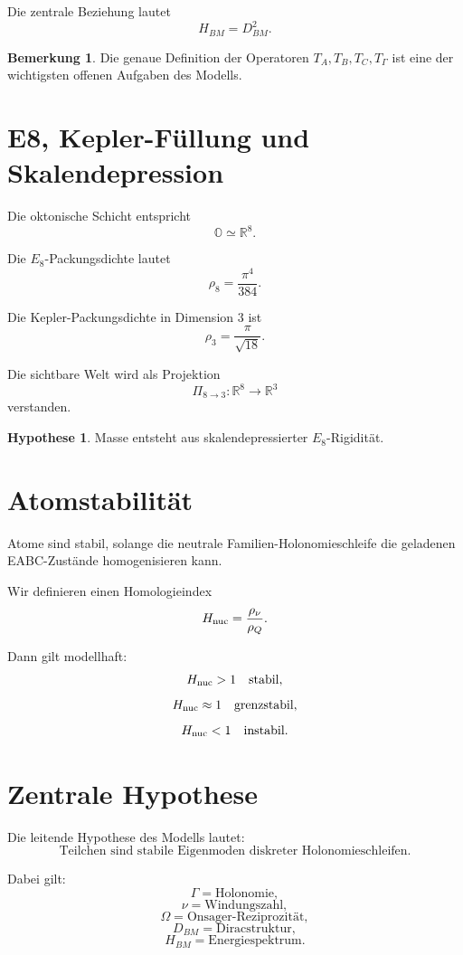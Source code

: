 \documentclass[11pt,a4paper]{article}
\theoremstyle{definition}
\newtheorem{hypothese}[satz]{Hypothese}
\newtheorem{bemerkung}[satz]{Bemerkung}
\begin{document}
	Die zentrale Beziehung lautet
	\[
	H_{BM}=D_{BM}^2.
	\]
	
	\begin{bemerkung}
		Die genaue Definition der Operatoren \(T_A,T_B,T_C,T_\Gamma\) ist eine der wichtigsten offenen Aufgaben des Modells.
	\end{bemerkung}
	
	\section{E8, Kepler-Füllung und Skalendepression}
	
	Die oktonische Schicht entspricht
	\[
	\mathbb O\simeq\mathbb R^8.
	\]
	
	Die \(E_8\)-Packungsdichte lautet
	\[
	\rho_8=\frac{\pi^4}{384}.
	\]
	
	Die Kepler-Packungsdichte in Dimension \(3\) ist
	\[
	\rho_3=\frac{\pi}{\sqrt{18}}.
	\]
	
	Die sichtbare Welt wird als Projektion
	\[
	\Pi_{8\to3}:\mathbb R^8\to\mathbb R^3
	\]
	verstanden.
	
	\begin{hypothese}
		Masse entsteht aus skalendepressierter \(E_8\)-Rigidität.
	\end{hypothese}
	
	\section{Atomstabilität}
	
	Atome sind stabil, solange die neutrale Familien-Holonomieschleife die geladenen EABC-Zustände homogenisieren kann.
	
	Wir definieren einen Homologieindex
	\[
	H_{\rm nuc}=\frac{\rho_\nu}{\rho_Q}.
	\]
	
	Dann gilt modellhaft:
	\[
	H_{\rm nuc}>1\quad\text{stabil},
	\]
	\[
	H_{\rm nuc}\approx1\quad\text{grenzstabil},
	\]
	\[
	H_{\rm nuc}<1\quad\text{instabil}.
	\]
	
	\section{Zentrale Hypothese}
	
	Die leitende Hypothese des Modells lautet:
	\[
	\boxed{
		\text{Teilchen sind stabile Eigenmoden diskreter Holonomieschleifen.}
	}
	\]
	
	Dabei gilt:
	\[
	\Gamma=\text{Holonomie},
	\]
	\[
	\nu=\text{Windungszahl},
	\]
	\[
	\Omega=\text{Onsager-Reziprozität},
	\]
	\[
	D_{BM}=\text{Diracstruktur},
	\]
	\[
	H_{BM}=\text{Energiespektrum}.
	\]
	
\end{document}
